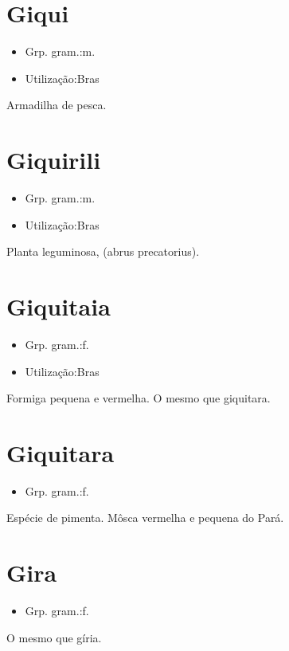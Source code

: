 \section{Giqui}
\begin{itemize}
\item {Grp. gram.:m.}
\end{itemize}
\begin{itemize}
\item {Utilização:Bras}
\end{itemize}
Armadilha de pesca.
\section{Giquirili}
\begin{itemize}
\item {Grp. gram.:m.}
\end{itemize}
\begin{itemize}
\item {Utilização:Bras}
\end{itemize}
Planta leguminosa, (\textunderscore abrus precatorius\textunderscore ).
\section{Giquitaia}
\begin{itemize}
\item {Grp. gram.:f.}
\end{itemize}
\begin{itemize}
\item {Utilização:Bras}
\end{itemize}
Formiga pequena e vermelha.
O mesmo que \textunderscore giquitara\textunderscore .
\section{Giquitara}
\begin{itemize}
\item {Grp. gram.:f.}
\end{itemize}
Espécie de pimenta.
Môsca vermelha e pequena do Pará.
\section{Gira}
\begin{itemize}
\item {Grp. gram.:f.}
\end{itemize}
O mesmo que \textunderscore gíria\textunderscore .
